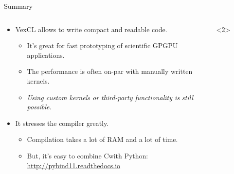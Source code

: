 \documentclass[@BEAMER_OPTIONS@]{beamer}
\newcommand{\CXX}{{\rm C}\plusplus}
\newcommand{\www}[1]{\href{#1}{#1}}
\begin{document}
\begin{frame}[fragile]{Summary}
    \begin{columns}
        \begin{column}{0.65\textwidth}
            \begin{itemize}
                \item VexCL allows to write compact and readable code.
                    \begin{itemize}
                        \item It's great for fast prototyping of scientific
                            GPGPU applications.
                            \vspace{0.5\baselineskip}
                        \item The performance is often on-par with manually
                            written kernels.
                            \vspace{0.5\baselineskip}
                        \item \emph{Using custom kernels or third-party
                            functionality is still possible.}
                    \end{itemize}
                    \vspace{\baselineskip}
                    \pause
                \item It stresses the compiler greatly.
                    \begin{itemize}
                        \item Compilation takes a lot of RAM and a lot of
                            time.
                        \item But, it's easy to combine \CXX with Python:
                            \www{http://pybind11.readthedocs.io}
                    \end{itemize}
            \end{itemize}
        \end{column}
        \begin{column}{0.3\textwidth}
            \begin{uncoverenv}<2>
                \begin{figure}

\end{figure}
\end{uncoverenv}
\end{column}
\end{columns}
\end{frame}
\end{document}
